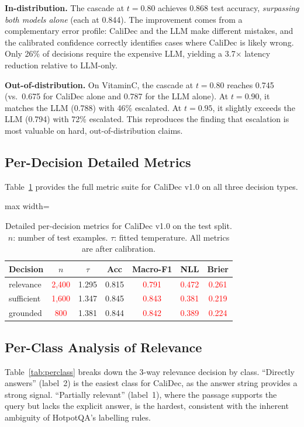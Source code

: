 \documentclass[twocolumn]{ICCKjournal}
\newcommand{\ph}[1]{\textcolor{red}{#1}}
\begin{document}
\textbf{In-distribution.} The cascade at $t=0.80$ achieves 0.868 test accuracy, \emph{surpassing both models alone} (each at 0.844). The improvement comes from a complementary error profile: CaliDec and the LLM make different mistakes, and the calibrated confidence correctly identifies cases where CaliDec is likely wrong. Only 26\% of decisions require the expensive LLM, yielding a 3.7$\times$ latency reduction relative to LLM-only.

\textbf{Out-of-distribution.} On VitaminC, the cascade at $t=0.80$ reaches 0.745 (vs.\ 0.675 for CaliDec alone and 0.787 for the LLM alone). At $t=0.90$, it matches the LLM (0.788) with 46\% escalated. At $t=0.95$, it slightly exceeds the LLM (0.794) with 72\% escalated. This reproduces the finding that escalation is most valuable on hard, out-of-distribution claims.

\subsection{Per-Decision Detailed Metrics}
\label{sec:detailed}
Table~\ref{tab:detailed} provides the full metric suite for CaliDec v1.0 on all three decision types.

\begin{table}[H]
\caption{Detailed per-decision metrics for CaliDec v1.0 on the test split. $n$: number of test examples. $\tau$: fitted temperature. All metrics are after calibration.}
\label{tab:detailed}
\centering
\small
\begin{adjustbox}{max width=\linewidth}
\begin{tabular}{lcccccc}
\toprule
\textbf{Decision} & $n$ & $\tau$ & \textbf{Acc} & \textbf{Macro-F1} & \textbf{NLL} & \textbf{Brier} \\
\midrule
relevance  & \ph{2,400} & 1.295 & 0.815 & \ph{0.791} & \ph{0.472} & \ph{0.261} \\
sufficient & \ph{1,600} & 1.347 & 0.845 & \ph{0.843} & \ph{0.381} & \ph{0.219} \\
grounded   & \ph{800}   & 1.381 & 0.844 & \ph{0.842} & \ph{0.389} & \ph{0.224} \\
\bottomrule
\end{tabular}
\end{adjustbox}
\end{table}

\subsection{Per-Class Analysis of Relevance}
\label{sec:perclass}
Table~\ref{tab:perclass} breaks down the 3-way relevance decision by class. ``Directly answers'' (label~2) is the easiest class for CaliDec, as the answer string provides a strong signal. ``Partially relevant'' (label~1), where the passage supports the query but lacks the explicit answer, is the hardest, consistent with the inherent ambiguity of HotpotQA's labelling rules.
\end{document}
